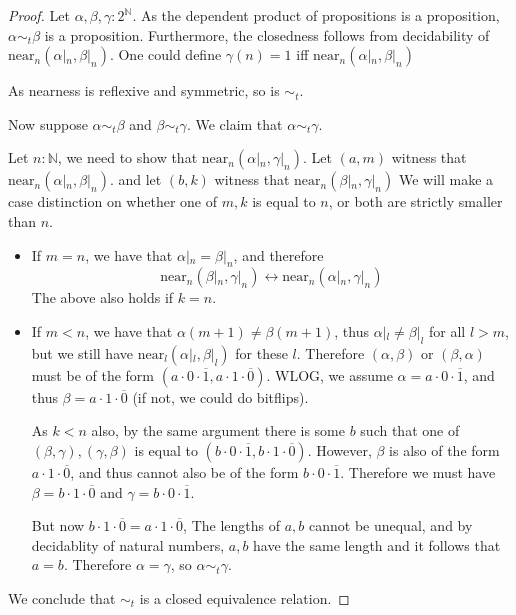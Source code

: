\begin{proof}
   Let $\alpha, \beta, \gamma : 2^\mathbb N$. 
   As the dependent product of propositions is a proposition, $\alpha \sim_t\beta$ is a proposition. 
   Furthermore, the closedness follows from decidability of $\text{near}_n(\alpha|_n, \beta|_n)$. 
   One could define $\gamma(n) = 1$ iff $\text{near}_n(\alpha|_n, \beta|_n)$
   
   As nearness is reflexive and symmetric, so is $\sim_t$. 

   Now suppose $\alpha \sim_t \beta$ and $\beta\sim_t \gamma$. 
   We claim that $\alpha \sim_t \gamma$. 

   Let $n:\mathbb N$, we need to show that 
   $\text{near}_n(\alpha|_n , \gamma|_n)$. 
   Let $(a,m)$ witness that $\text{near}_n(\alpha|_n, \beta|_n)$.
   and let $(b, k)$ witness that $\text{near}_n(\beta|_n, \gamma|_n)$
   We will make a case distinction on whether one of $m,k$ is equal to $n$, or
   both are strictly smaller than $n$. 
   \begin{itemize}
     \item 
       If $m=n$, we have that $\alpha|_n = \beta|_n$, and therefore 
       \begin{equation}
         \text{near}_n(\beta|_n, \gamma|_n) \leftrightarrow \text{near}_n(\alpha|_n, \gamma|_n)
       \end{equation} 
       The above also holds if $k = n$.
     \item 
       If $m< n$, we have that $\alpha(m+1) \neq \beta(m+1)$, thus 
       $\alpha|_l \neq \beta|_l$ for all $l>m$, 
       but we still have $\text{near}_l(\alpha|_l, \beta|_l)$ for these $l$. 
       Therefore $(\alpha, \beta)$ or $(\beta, \alpha)$ must be of the form
       $(a \cdot 0 \cdot \overline 1, a \cdot 1 \cdot \overline 0)$. 
       WLOG, we assume $\alpha = a \cdot 0 \cdot \overline 1$, and thus 
       $\beta = a \cdot 1 \cdot \overline 0$ (if not, we could do bitflips). 

       As $k<n$ also, by the same argument there is some $b$ such that one of 
       $(\beta,\gamma), (\gamma, \beta)$
       is equal to $(b\cdot 0 \cdot \overline 1, b \cdot 1 \cdot \overline 0)$. 
       However, $\beta$ is also of the form $a \cdot 1 \cdot \overline 0$, and 
       thus cannot also be of the form $b \cdot 0 \cdot \overline 1$. 
       Therefore we must have 
       $\beta = b\cdot 1 \cdot \overline 0$ and 
       $\gamma= b\cdot 0 \cdot \overline 1$. 

       But now $b \cdot 1 \cdot \overline 0 = a \cdot 1 \cdot \overline 0$, 
       The lengths of $a,b$ cannot be unequal, and by decidablity of natural numbers, 
       $a,b$ have the same length and it follows that $ a = b$. 
       Therefore $ \alpha = \gamma$, so $\alpha \sim_t\gamma$.
   \end{itemize}

   We conclude that $\sim_t$ is a closed equivalence relation. 
\end{proof}
